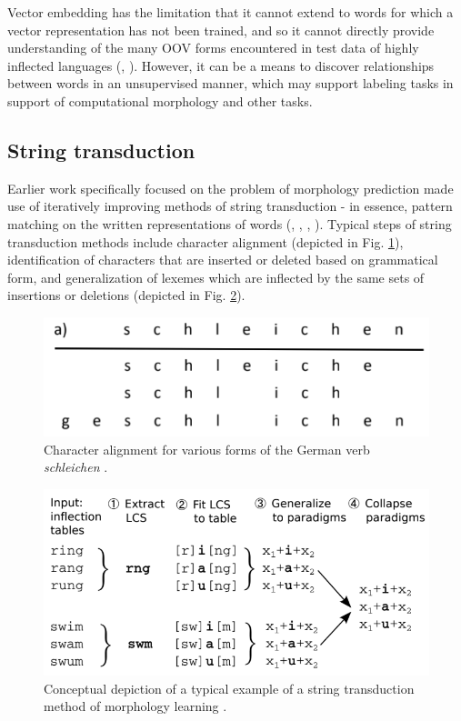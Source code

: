 Vector embedding has the limitation that it cannot extend to words for which a vector representation has not been trained, and so it cannot directly provide understanding of the many OOV forms encountered in test data of highly inflected languages (\cite{Soricut2015}, \cite{Cotterell2019}). However, it can be a means to discover relationships between words in an unsupervised manner, which may support labeling tasks in support of computational morphology and other tasks.

\subsection{String transduction}

Earlier work specifically focused on the problem of morphology prediction made use of iteratively improving methods of string transduction - in essence, pattern matching on the written representations of words (\cite{Durrett2013}, \cite{Hulden2014}, \cite{Nicolai2015}, \cite{Ahlberg2015}). Typical steps of string transduction methods include character alignment (depicted in Fig. \ref{fig:chalign}), identification of characters that are inserted or deleted based on grammatical form, and generalization of lexemes which are inflected by the same sets of insertions or deletions (depicted in Fig. \ref{fig:transduction}). 

\begin{figure}[ht]
\includegraphics[width=12cm]{images/Nicolai2015_schleichen.png}
\centering
\caption{Character alignment for various forms of the German verb \textit{schleichen} \parencite{Nicolai2015}.}
\label{fig:chalign}
\end{figure}

\begin{figure}[ht]
\includegraphics[width=12cm]{images/Hulden2014_diagram.png}
\centering
\caption{Conceptual depiction of a typical example of a string transduction method of morphology learning \parencite{Hulden2014}.}
\label{fig:transduction}
\end{figure}

